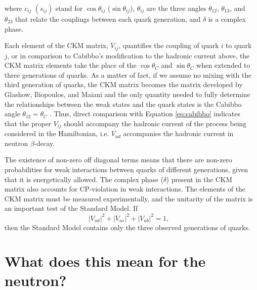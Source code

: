 \noindent where $c_{ij}$ $(s_{ij})$ stand for $\cos\theta_{ij}$ ($\sin\theta_{ij}$), $\theta_{ij}$
are the three angles $\theta_{12}$, $\theta_{13}$, and $\theta_{23}$ that relate the couplings
between each quark generation, and $\delta$ is a
complex phase.

Each element of the CKM matrix, $V_{ij}$, quantifies the coupling of quark $i$
to quark $j$, or in comparison to Cabibbo's modification to the hadronic current
above, the CKM matrix elements take the place of the $\cos\theta_C$ and $\sin\theta_C$
when extended to three generations of quarks. As a matter of fact, if we assume no mixing
with the third generation of quarks, the CKM matrix becomes the matrix developed by
Glashow, Iliopoulos, and Maiani and the only quantity needed to fully determine
the relationships between the weak states and the quark states is the Cabibbo angle $\theta_{12}=\theta_C$
\cite{griffiths2008}.
Thus, direct comparison with Equation \ref{eq:cabibbo} indicates that the proper
$V_{ij}$ should accompany the hadronic current
of the process being considered in the Hamiltonian, i.e. $V_{ud}$ accompanies the hadronic
current in neutron $\beta$-decay.

The existence of non-zero off diagonal terms means that there are non-zero probabilities for
weak interactions between quarks of different generations, given that it is energetically
allowed. The complex phase ($\delta$) present in the CKM
matrix also accounts for CP-violation in weak interactions.
The elements of the CKM matrix must be measured experimentally, and the unitarity of the matrix
is an important test of the Standard Model. If
%
\begin{equation}
  |V_{ud}|^2 + |V_{us}|^2 + |V_{ub}|^2 = 1,
\end{equation}
then the Standard Model contains only the three observed generations of quarks.


\section{What does this mean for the neutron?}

